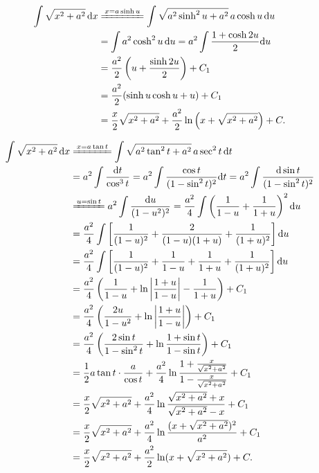\begin{solution}[解法 2]
\begin{align*}
\int\sqrt{x^{2}+a^{2}}\,\mathrm{d}x&\xlongequal{x=a\sinh u}\int\sqrt{a^{2}\sinh^{2}u+a^{2}}\,a\cosh u\,\mathrm{d}u\\
&=\int a^{2}\cosh^{2}u\,\mathrm{d}u=a^{2}\int\frac{1+\cosh 2u}{2}\mathrm{d}u\\
&=\frac{a^{2}}{2}\left(u+\frac{\sinh 2u}{2}\right)+C_{1}\\
&=\frac{a^{2}}{2}(\sinh u\cosh u+u)+C_{1}\\
&=\frac{x}{2}\sqrt{x^{2}+a^{2}}+\frac{a^{2}}{2}\ln\left(x+\sqrt{x^{2}+a^{2}}\right)+C.
\end{align*}
\end{solution}

\begin{solution}[解法 3]
\begin{align*}
\int\sqrt{x^{2}+a^{2}}\,\mathrm{d}x&\xlongequal{x=a\tan t}\int\sqrt{a^{2}\tan^{2}t+a^{2}}\,a\sec^{2}t\,\mathrm{d}t\\
&=a^{2}\int\frac{\mathrm{d}t}{\cos^{3}t}=a^{2}\int\frac{\cos t}{(1-\sin^{2}t)^{2}}\mathrm{d}t
=a^{2}\int\frac{\mathrm{d}\sin t}{(1-\sin^{2}t)^{2}}\\
&\xlongequal{u=\sin t}a^{2}\int\frac{\mathrm{d}u}{(1-u^{2})^{2}}=\frac{a^{2}}{4}\int\left(\frac{1}{1-u}+\frac{1}{1+u}\right)^{2}\mathrm{d}u\\
&=\frac{a^{2}}{4}\int\left[\frac{1}{(1-u)^{2}}+\frac{2}{(1-u)(1+u)}+\frac{1}{(1+u)^{2}}\right]\mathrm{d}u\\
&=\frac{a^{2}}{4}\int\left[\frac{1}{(1-u)^{2}}+\frac{1}{1-u}+\frac{1}{1+u}+\frac{1}{(1+u)^{2}}\right]\mathrm{d}u\\
&=\frac{a^{2}}{4}\left(\frac{1}{1-u}+\ln\left|\frac{1+u}{1-u}\right|-\frac{1}{1+u}\right)+C_{1}\\
&=\frac{a^{2}}{4}\left(\frac{2u}{1-u^{2}}+\ln\left|\frac{1+u}{1-u}\right|\right)+C_{1}\\
&=\frac{a^{2}}{4}\left(\frac{2\sin t}{1-\sin^{2}t}+\ln\frac{1+\sin t}{1-\sin t}\right)+C_{1}\\
&=\frac{1}{2}a\tan t\cdot\frac{a}{\cos t}+\frac{a^{2}}{4}\ln\frac{1+\frac{x}{\sqrt{x^{2}+a^{2}}}}{1-\frac{x}{\sqrt{x^{2}+a^{2}}}}+C_{1}\\
&=\frac{x}{2}\sqrt{x^{2}+a^{2}}+\frac{a^{2}}{4}\ln\frac{\sqrt{x^{2}+a^{2}}+x}{\sqrt{x^{2}+a^{2}}-x}+C_{1}\\
&=\frac{x}{2}\sqrt{x^{2}+a^{2}}+\frac{a^{2}}{4}\ln\frac{(x+\sqrt{x^{2}+a^{2}})^{2}}{a^{2}}+C_{1}\\
&=\frac{x}{2}\sqrt{x^{2}+a^{2}}+\frac{a^{2}}{2}\ln(x+\sqrt{x^{2}+a^{2}})+C.
\end{align*}
\end{solution}

